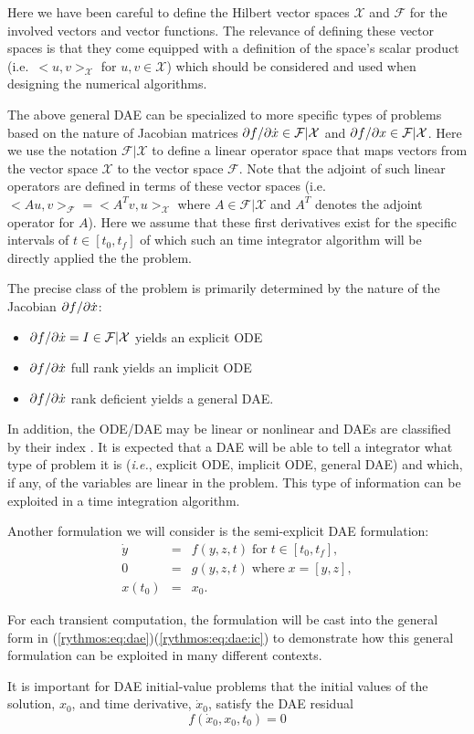Here we have been careful to define the Hilbert vector spaces $\mathcal{X}$
and $\mathcal{F}$ for the involved vectors and vector functions.
The relevance of defining these vector spaces is that they come equipped
with a definition of the space's scalar product (i.e.\ $<u,v>_{\mathcal{X}}$
for $u,v\in\mathcal{X}$) which should be considered and used when
designing the numerical algorithms.

The above general DAE can be specialized to more specific types of
problems based on the nature of Jacobian matrices $\partial f / \partial \dot{x}\in\mathcal{F}|\mathcal{X}$
and $\partial f / \partial x\in\mathcal{F}|\mathcal{X}$. Here we use the notation
$\mathcal{F}|\mathcal{X}$ to define a linear operator space that
maps vectors from the vector space $\mathcal{X}$ to the vector space
$\mathcal{F}$. Note that the adjoint of such linear operators are
defined in terms of these vector spaces (i.e.\ $<Au,v>_{\mathcal{F}}=<A^{T}v,u>_{\mathcal{X}}$
where $A\in\mathcal{F}|\mathcal{X}$ and $A^{T}$ denotes the adjoint
operator for $A$). Here we assume that these first derivatives exist
for the specific intervals of $t\in[t_{0},t_{f}]$ of which such an
time integrator algorithm will be directly applied the the problem.

The precise class of the problem is primarily determined by the nature
of the Jacobian $\partial f / \partial \dot{x}$: 
\begin{itemize}
\item $\partial f / \partial \dot{x}=I\in\mathcal{F}|\mathcal{X}$ yields an explicit
ODE 
\item $\partial f / \partial \dot{x}$ full rank yields an implicit ODE 
\item $\partial f / \partial \dot{x}$ rank deficient yields a general DAE. 
\end{itemize}
In addition, the ODE/DAE may be linear or nonlinear and DAEs are classified
by their index \cite{BCP}. It is expected that a DAE will be able
to tell a integrator what type of problem it is (\emph{i.e.}, explicit
ODE, implicit ODE, general DAE) and which, if any, of the variables
are linear in the problem. This type of information can be exploited
in a time integration algorithm.

Another formulation we will consider is the semi-explicit DAE formulation:
\begin{equation}
\begin{array}{rcl}
\dot{y} & = & f(y,z,t)\;\mbox{for}\;t\in[t_{0},t_{f}],\\
0 & = & g(y,z,t)\;\mbox{where}\;x=[y,z],\\
x(t_{0}) & = & x_{0}.
\end{array}\label{rythmos:eq:dae:semiexplicit}
\end{equation}

For each transient computation, the formulation will be cast into
the general form in (\ref{rythmos:eq:dae})\textendash (\ref{rythmos:eq:dae:ic})
to demonstrate how this general formulation can be exploited in many
different contexts. 

It is important for DAE initial-value problems that the initial values
of the solution, $x_{0}$, and time derivative, $\dot{x}_{0}$, satisfy
the DAE residual\cite{Brown1998}
\[
f(\dot{x}_{0},x_{0},t_{0})=0
\]

